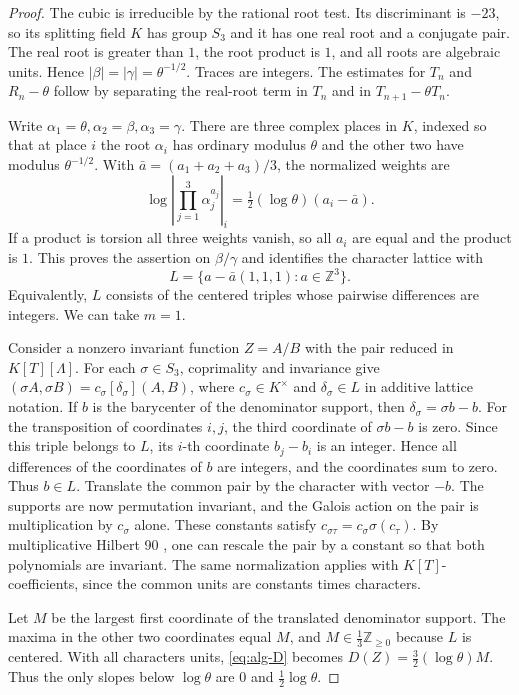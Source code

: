 \documentclass[11pt,a4paper,reqno]{amsart}
\theoremstyle{definition}
\theoremstyle{remark}
\numberwithin{equation}{section}
\begin{document}
\begin{proof}
The cubic is irreducible by the rational root test. Its discriminant
is \(-23\), so its splitting field \(K\) has group \(S_3\) and
it has one real root and a conjugate pair. The real root is greater
than \(1\), the root product is \(1\), and all roots are algebraic
units. Hence \(|\beta|=|\gamma|=\theta^{-1/2}\). Traces are
integers. The estimates for \(T_n\) and \(R_n-\theta\) follow by
separating the real-root term in \(T_n\) and in \(T_{n+1}-\theta T_n\).

Write \(\alpha_1=\theta,\alpha_2=\beta,\alpha_3=\gamma\).
There are three complex places in \(K\), indexed so that at place
\(i\) the root \(\alpha_i\) has ordinary modulus \(\theta\)
and the other two have modulus \(\theta^{-1/2}\).
With \(\bar a=(a_1+a_2+a_3)/3\), the normalized weights are
\[
 \log\left|\prod_{j=1}^3\alpha_j^{a_j}\right|_i
 =\tfrac12(\log\theta)(a_i-\bar a).
\]
If a product is torsion all three weights vanish, so all \(a_i\)
are equal and the product is \(1\). This proves the assertion on
\(\beta/\gamma\) and identifies the character lattice with
\[
 L=\{a-\bar a(1,1,1):a\in\mathbb Z^3\}.
\]
Equivalently, \(L\) consists of the centered triples whose pairwise
differences are integers. We can take \(m=1\).

Consider a nonzero invariant function \(Z=A/B\) with the pair
reduced in \(K[T][\Lambda]\). For each \(\sigma\in S_3\),
coprimality and invariance give
\((\sigma A,\sigma B)=c_\sigma[\delta_\sigma](A,B)\), where
\(c_\sigma\in K^\times\) and \(\delta_\sigma\in L\) in additive
lattice notation. If \(b\) is the barycenter of the denominator
support, then \(\delta_\sigma=\sigma b-b\).
For the transposition of coordinates \(i,j\), the third coordinate
of \(\sigma b-b\) is zero. Since this triple belongs to \(L\),
its \(i\)-th coordinate \(b_j-b_i\) is an integer. Hence all
differences of the coordinates of \(b\) are integers, and the
coordinates sum to zero. Thus \(b\in L\).
Translate the common pair by the character with vector \(-b\).
The supports are now permutation invariant, and the Galois action
on the pair is multiplication by \(c_\sigma\) alone. These constants
satisfy \(c_{\sigma\tau}=c_\sigma\sigma(c_\tau)\). By multiplicative
Hilbert 90 \cite[Chapter~II, Proposition~1.22]{Hilbert90Milne}, one can rescale the pair by a
constant so that both polynomials are invariant. The same
normalization applies with \(K[T]\)-coefficients, since the common
units are constants times characters.

Let \(M\) be the largest first coordinate of the translated
denominator support. The maxima in the other two coordinates
equal \(M\), and \(M\in\frac13\mathbb Z_{\ge0}\) because \(L\) is
centered. With all characters units, \eqref{eq:alg-D} becomes
\(D(Z)=\frac32(\log\theta)M\). Thus the only slopes below
\(\log\theta\) are \(0\) and \(\tfrac12\log\theta\).


\end{proof}
\end{document}
